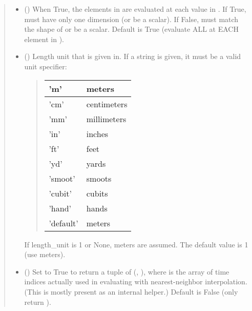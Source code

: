 \documentclass[letterpaper,10pt,english]{sphinxmanual}
\begin{document}
\begin{fulllineitems}
\begin{fulllineitems}
\begin{quote}
\begin{description}
\begin{itemize}
\item {} 
 () \textendash{} When True, the elements in  are evaluated
at each value in . If True,  must have only one dimension
(or be a scalar). If False,  must match the shape of 
or be a scalar. Default is True (evaluate ALL  at EACH
element in ).

\item {} 
 () \textendash{} 
Length unit that  is given in.
If a string is given, it must be a valid unit specifier:
\begin{quote}


\begin{savenotes}\sphinxattablestart
\centering
\begin{tabulary}{\linewidth}[t]{|T|T|}
\hline

’m’
&
meters
\\
\hline
’cm’
&
centimeters
\\
\hline
’mm’
&
millimeters
\\
\hline
’in’
&
inches
\\
\hline
’ft’
&
feet
\\
\hline
’yd’
&
yards
\\
\hline
’smoot’
&
smoots
\\
\hline
’cubit’
&
cubits
\\
\hline
’hand’
&
hands
\\
\hline
’default’
&
meters
\\
\hline
\end{tabulary}
\par
\sphinxattableend\end{savenotes}
\end{quote}

If length\_unit is 1 or None, meters are assumed. The default
value is 1 (use meters).


\item {} 
 () \textendash{} Set to True to return a tuple of (,
), where  is the array of time indices
actually used in evaluating  with nearest-neighbor
interpolation. (This is mostly present as an internal helper.)
Default is False (only return ).


\end{itemize}
\end{description}
\end{quote}
\end{fulllineitems}
\end{fulllineitems}
\end{document}
